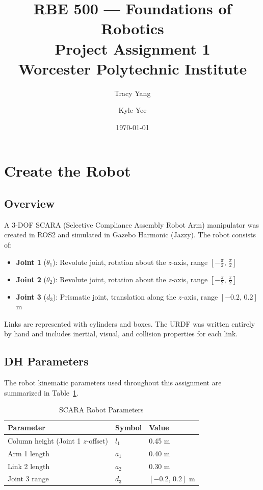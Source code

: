 \documentclass[12pt]{article}
\title{
    \vspace{-1cm}
    \large RBE 500 --- Foundations of Robotics \\[0.4em]
    \LARGE \textbf{Project Assignment 1} \\[0.4em]
    \large Worcester Polytechnic Institute
}
\author{Tracy Yang \and Kyle Yee}
\date{\today}
\begin{document}
\maketitle

\section{Create the Robot}

\subsection{Overview}

A 3-DOF SCARA (Selective Compliance Assembly Robot Arm) manipulator was created
in ROS2 and simulated in Gazebo Harmonic (Jazzy). The robot consists of:

\begin{itemize}
    \item \textbf{Joint 1} ($\theta_1$): Revolute joint, rotation about the $z$-axis,
          range $[-\frac{\pi}{2},\, \frac{\pi}{2}]$
    \item \textbf{Joint 2} ($\theta_2$): Revolute joint, rotation about the $z$-axis,
          range $[-\frac{\pi}{2},\, \frac{\pi}{2}]$
    \item \textbf{Joint 3} ($d_3$): Prismatic joint, translation along the $z$-axis,
          range $[-0.2,\, 0.2]$ m
\end{itemize}

Links are represented with cylinders and boxes. The URDF was written entirely by
hand and includes inertial, visual, and collision properties for each link.

\subsection{DH Parameters}

The robot kinematic parameters used throughout this assignment are summarized in
Table~\ref{tab:dh}.

\begin{table}[H]
\centering
\caption{SCARA Robot Parameters}
\label{tab:dh}
\begin{tabular}{lll}
\toprule
\textbf{Parameter} & \textbf{Symbol} & \textbf{Value} \\
\midrule
Column height (Joint 1 $z$-offset) & $l_1$ & 0.45 m \\
Arm 1 length                        & $a_1$ & 0.40 m \\
Link 2 length                       & $a_2$ & 0.30 m \\
Joint 3 range                       & $d_3$ & $[-0.2,\, 0.2]$ m \\
\bottomrule
\end{tabular}
\end{table}
\end{document}
